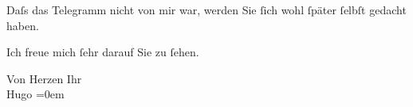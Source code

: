 \pstart
           Daſs das Telegramm nicht von mir war, werden Sie{ }ſich wohl{ }ſpäter{ }ſelbſt gedacht
               haben.\pend
           
\pstart
           Ich freue mich{ }ſehr darauf Sie zu{ }ſehen.\pend
           
\pstart
           Von Herzen Ihr{\\[\baselineskip]}\spacefill\mbox{Hugo}\pend
           \leftskip=0em{}\endnumbering{}  \newcommand{\dateiname}{L00619}\newcommand{\titel}{Hugo von Hofmannsthal an Arthur Schnitzler, 9. 11. [1896]}\newcommand{\editorInnen}{Martin Anton Müller und Gerd-Hermann Susen}
